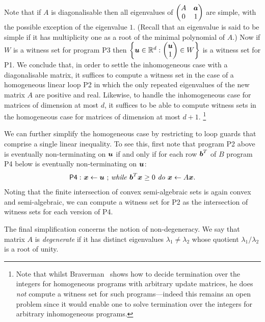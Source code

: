 Note that if $A$ is diagonalisable then all
eigenvalues of
$\begin{pmatrix}A&\boldsymbol{a}\\ 0 & 1
\end{pmatrix}$ are simple, with the possible exception of the
eigenvalue $1$.  (Recall that an eigenvalue is said to be simple if it
has multiplicity one as a root of the minimal polynomial of $A$.)  Now
if $W$ is a witness set for program \textsf{P3} then $\left\{
  \boldsymbol{u} \in \mathbb{R}^{d} : \begin{pmatrix} \boldsymbol{u}\\
    1\end{pmatrix} \in W \right\}$ is a witness set for \textsf{P1}.
We conclude that, in order to settle the inhomogeneous case with a
diagonalisable matrix, it suffices to compute a witness set in the
case of a homogeneous linear loop \textsf{P2} in which the only
repeated eigenvalues of the new matrix $A$ are positive and real.
Likewise, to handle the inhomogeneous case for matrices of dimension
at most $d$, it suffices to be able to compute witness sets in the
homogeneous case for matrices of dimension at most $d+1$.%
\footnote{Note that whilst Braverman~\cite{Bra06} shows how to decide
  termination over the integers for homogeneous programs with
  arbitrary update matrices, he does \emph{not} compute a witness set
  for such programs---indeed this remains an open problem since it
  would enable one to solve termination over the integers for
  arbitrary inhomogeneous programs.}

We can further simplify the homogeneous case by restricting to loop
guards that comprise a single linear inequality.  To see this, first
note that program \textsf{P2} above is eventually non-terminating on
$\boldsymbol{u}$ if and only if for each row $\boldsymbol{b}^T$ of $B$
program \textsf{P4} below is eventually non-terminating on
$\boldsymbol{u}$:
\begin{gather*}
\mathsf{P4:}\ \mbox{$\boldsymbol{x}\gets \boldsymbol{u}$ ;
\textit{while} $\boldsymbol{b}^T\boldsymbol{x} \geq 0$ \textit{do} $\boldsymbol{x}\leftarrow A\boldsymbol{x}$.}
\end{gather*}
Noting that the finite intersection of convex semi-algebraic sets is
again convex and semi-algebraic, we can compute a witness set
for \textsf{P2} as the intersection of witness sets for each version
of \textsf{P4}.

The final simplification concerns the notion of
non-degeneracy.  We say that matrix $A$ is \emph{degenerate} if it has
distinct eigenvalues $\lambda_1 \neq \lambda_2$ whose quotient
$\lambda_1/\lambda_2$ is a root of unity.

